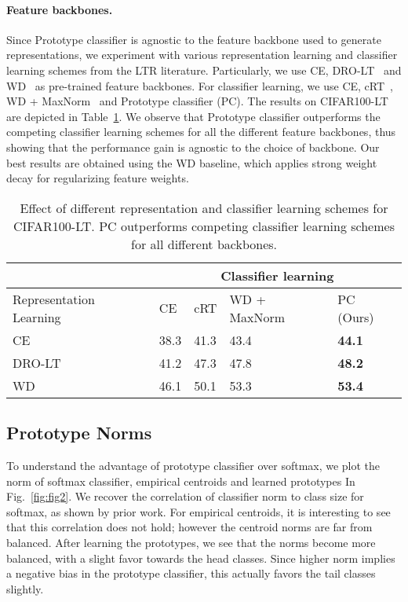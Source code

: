 \documentclass{article}
\begin{document}
\paragraph{Feature backbones.}
Since Prototype classifier is agnostic to the feature backbone used to generate representations, we experiment with various representation learning and classifier learning schemes from the LTR literature. Particularly, we use CE, DRO-LT~\cite{samuel2021distributional} and WD~\cite{alshammari2022long} as pre-trained feature backbones. For classifier learning, we use CE, cRT~\cite{kang2019decoupling}, WD + MaxNorm~\cite{alshammari2022long} and Prototype classifier (PC). The results on CIFAR100-LT are depicted in Table~\ref{tab:table 3}. We observe that Prototype classifier outperforms the competing classifier learning schemes for all the different feature backbones, thus showing that the performance gain is agnostic to the choice of backbone. Our best results are obtained using the WD baseline, which applies strong weight decay for regularizing feature weights. 
\begin{table}[ht]
\begin{tabular}{p{2.4cm} | l | l | p{1.5cm} | l}
    \toprule
    & \multicolumn{4}{c}{Classifier learning}\\
    \midrule
    Representation Learning & CE & cRT & WD + MaxNorm & PC (Ours) \\
    \midrule
    CE & 38.3 & 41.3 & 43.4 & \textbf{44.1} \\
    DRO-LT & 41.2 & 47.3 & 47.8 & \textbf{48.2} \\
    WD & 46.1 & 50.1 & 53.3 & \textbf{53.4} \\
    \bottomrule
    \end{tabular}
    \caption{Effect of different representation and classifier learning schemes for CIFAR100-LT. PC outperforms competing classifier learning schemes for all different backbones.}
    \label{tab:table 3}
\end{table}

\subsection{Prototype Norms}
\label{prototype norms}
To understand the advantage of prototype classifier over softmax, we plot the norm of softmax classifier, empirical centroids and learned prototypes In Fig.~\ref{fig:fig2}. We recover the correlation of classifier norm to class size for softmax, as shown by prior work. For empirical centroids, it is interesting to see that this correlation does not hold; however the centroid norms are far from balanced. After learning the prototypes, we see that the norms become more balanced, with a slight favor towards the head classes. Since higher norm implies a negative bias in the prototype classifier, this actually favors the tail classes slightly.    
\end{document}
